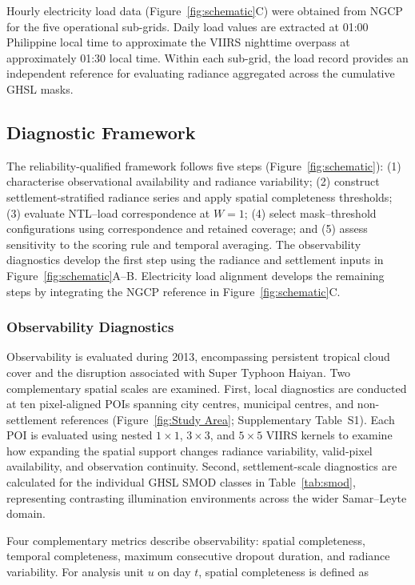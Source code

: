 \documentclass[]{interact}
\theoremstyle{plain}%
\theoremstyle{definition}
\theoremstyle{remark}
\begin{document}
    Hourly electricity load data (Figure~\ref{fig:schematic}C) were obtained from NGCP \citep{NGCP_HourlyDemand} for the five operational sub-grids. Daily load values are extracted at 01:00 Philippine local time to approximate the VIIRS nighttime overpass at approximately 01:30 local time. Within each sub-grid, the load record provides an independent reference for evaluating radiance aggregated across the cumulative GHSL masks.
    
    \subsection{Diagnostic Framework}
    
    The reliability-qualified framework follows five steps (Figure~\ref{fig:schematic}): (1) characterise observational availability and radiance variability; (2) construct settlement-stratified radiance series and apply spatial completeness thresholds; (3) evaluate NTL--load correspondence at $W=1$; (4) select mask--threshold configurations using correspondence and retained coverage; and (5) assess sensitivity to the scoring rule and temporal averaging. The observability diagnostics develop the first step using the radiance and settlement inputs in Figure~\ref{fig:schematic}A--B. Electricity load alignment develops the remaining steps by integrating the NGCP reference in Figure~\ref{fig:schematic}C.

    \subsubsection{Observability Diagnostics}
        
        Observability is evaluated during 2013, encompassing persistent tropical cloud cover and the disruption associated with Super Typhoon Haiyan. Two complementary spatial scales are examined. First, local diagnostics are conducted at ten pixel-aligned POIs spanning city centres, municipal centres, and non-settlement references (Figure~\ref{fig:Study Area}; Supplementary Table~S1). Each POI is evaluated using nested $1\times1$, $3\times3$, and $5\times5$ VIIRS kernels to examine how expanding the spatial support changes radiance variability, valid-pixel availability, and observation continuity. Second, settlement-scale diagnostics are calculated for the individual GHSL SMOD classes in Table~\ref{tab:smod}, representing contrasting illumination environments across the wider Samar--Leyte domain.
        
        Four complementary metrics describe observability: spatial completeness, temporal completeness, maximum consecutive dropout duration, and radiance variability. For analysis unit $u$ on day $t$, spatial completeness is defined as
        
\end{document}
